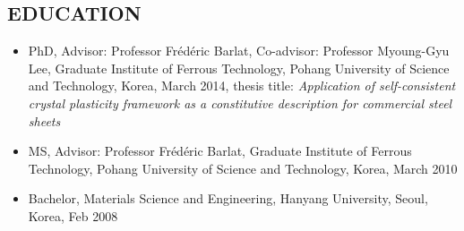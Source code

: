 \documentclass{res}
\begin{document}

\address{\bf Center for Automotive Lightweighting \\
  \bf National Institute of Standards and Technology \\
  \bf US Department of Commerce \\
  \bf 100 Bureau Drive Stop 8553, \\
  \bf Gaithersburg, MD, US \\
  \bf zip: 20899-8553
  \bf +1 (301) 975-5028,  youngung.jeong@nist.gov}

\begin{resume}
  \section{EDUCATION}
  \begin{itemize}
  \item PhD, Advisor: Professor Fr\'ed\'eric Barlat, Co-advisor: Professor Myoung-Gyu Lee, Graduate Institute of Ferrous Technology, Pohang University of Science and Technology, Korea, March 2014,
    thesis title: {\it Application of self-consistent crystal plasticity framework as a constitutive description for commercial steel sheets}
  \item MS, Advisor: Professor Fr\'ed\'eric Barlat, Graduate Institute of Ferrous Technology, Pohang University of Science and Technology, Korea, March 2010
  \item Bachelor, Materials Science and Engineering, Hanyang University, Seoul, Korea, Feb 2008
  \end{itemize}


\end{resume}
\end{document}
